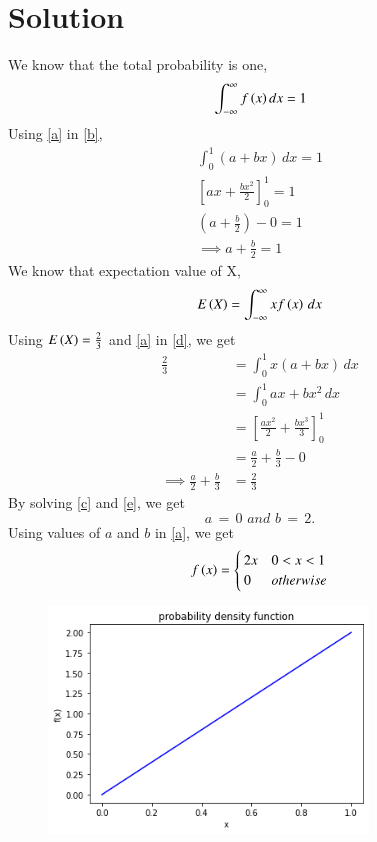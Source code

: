 \documentclass[journal,12pt,twocolumn]{IEEEtran}
\begin{document}
\section{Solution}
We know that the total probability is one,
\begin{equation}
    \int_{-\infty}^{\infty}{f\left(x\right) dx} = 1\label{b}
\end{equation}
Using \eqref{a} in \eqref{b},
\begin{align}
    \int_{0}^{1}{(a+bx)\,dx} = 1\\
    \left[ax+\frac{bx^2}{2}\right]_0^1=1\\
    \left(a+\frac{b}{2}\right)-0=1\\
    \implies a+\frac{b}{2}=1 \label{c}
\end{align}
We know that expectation value of X,
\begin{align}
    E\left(X\right)=\int_{-\infty}^{\infty}xf\left(x\right)\,dx\label{d}
\end{align}
\newpage
Using $E\left(X\right)=\frac{2}{3}$ and \eqref{a} in \eqref{d}, we get
\begin{align}
     \frac{2}{3}&=\int_{0}^{1}x(a+bx)\,dx\\
     &=\int_{0}^{1} ax+bx^2\,dx\\
     &= \left[\frac{ax^2}{2}+\frac{bx^3}{3}\right]_0^1\\
     &= \frac{a}{2}+\frac{b}{3}-0\\
     \implies\frac{a}{2}+\frac{b}{3}&=\frac{2}{3}\label{e}
\end{align}
By solving \eqref{c} and \eqref{e}, we get \\
$$a\, =\, 0 \,\,and\,\, b\, =\, 2.$$
Using values of $a$ and $b$ in \eqref{a}, we get
\begin{align}
f\left(x\right)
= 
\begin{cases}
2x & 0<x<1
\\
0 & otherwise\label{f}\\
\end{cases}
\end{align}
\begin{figure}[htp]
    \centering
    \includegraphics[width=8.5cm]{assign2.png}
\end{figure}
\end{document}
